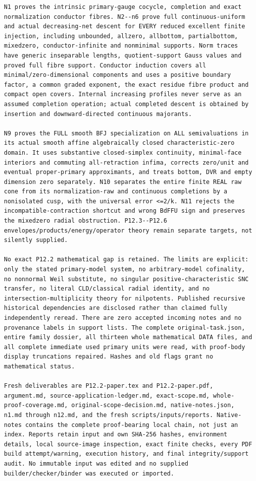 \documentclass[
]{article}
\begin{document}
\begin{verbatim}
N1 proves the intrinsic primary-gauge cocycle, completion and exact normalization conductor fibres. N2--n6 prove full continuous-uniform and actual decreasing-net descent for EVERY reduced excellent finite injection, including unbounded, allzero, allbottom, partialbottom, mixedzero, conductor-infinite and nonminimal supports. Norm traces have generic inseparable lengths, quotient-support Gauss values and proved full fibre support. Conductor induction covers all minimal/zero-dimensional components and uses a positive boundary factor, a common graded exponent, the exact residue fibre product and compact open covers. Internal increasing profiles never serve as an assumed completion operation; actual completed descent is obtained by insertion and downward-directed continuous majorants.

N9 proves the FULL smooth BFJ specialization on ALL semivaluations in its actual smooth affine algebraically closed characteristic-zero domain. It uses substantive closed-simplex continuity, minimal-face interiors and commuting all-retraction infima, corrects zero/unit and eventual proper-primary approximants, and treats bottom, DVR and empty dimension zero separately. N10 separates the entire finite REAL raw cone from its normalization-raw and continuous completions by a nonisolated cusp, with the universal error <=2/k. N11 rejects the incompatible-contraction shortcut and wrong BdFFU sign and preserves the mixedzero radial obstruction. P12.3--P12.6 envelopes/products/energy/operator theory remain separate targets, not silently supplied.

No exact P12.2 mathematical gap is retained. The limits are explicit: only the stated primary-model system, no arbitrary-model cofinality, no nonnormal Weil substitute, no singular positive-characteristic SNC transfer, no literal CLD/classical radial identity, and no intersection-multiplicity theory for nilpotents. Published recursive historical dependencies are disclosed rather than claimed fully independently reread. There are zero accepted incoming notes and no provenance labels in support lists. The complete original-task.json, entire family dossier, all thirteen whole mathematical DATA files, and all complete immediate used primary units were read, with proof-body display truncations repaired. Hashes and old flags grant no mathematical status.

Fresh deliverables are P12.2-paper.tex and P12.2-paper.pdf, argument.md, source-application-ledger.md, exact-scope.md, whole-proof-coverage.md, original-scope-decision.md, native-notes.json, n1.md through n12.md, and the fresh scripts/inputs/reports. Native-notes contains the complete proof-bearing local chain, not just an index. Reports retain input and own SHA-256 hashes, environment details, local source-image inspection, exact finite checks, every PDF build attempt/warning, execution history, and final integrity/support audit. No immutable input was edited and no supplied builder/checker/binder was executed or imported.


\end{verbatim}
\end{document}
